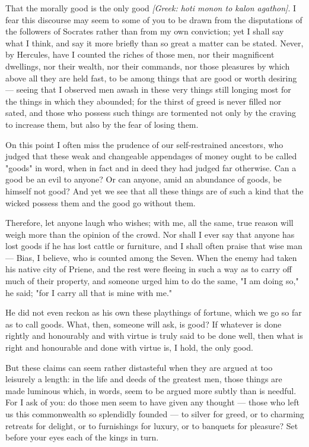  That the morally good is the only good \textit{[Greek: hoti monon to kalon agathon]}. I fear this discourse may seem to some of you to be drawn from the disputations of the followers of Socrates rather than from my own conviction; yet I shall say what I think, and say it more briefly than so great a matter can be stated. Never, by Hercules, have I counted the riches of those men, nor their magnificent dwellings, nor their wealth, nor their commands, nor those pleasures by which above all they are held fast, to be among things that are good or worth desiring — seeing that I observed men awash in these very things still longing most for the things in which they abounded; for the thirst of greed is never filled nor sated, and those who possess such things are tormented not only by the craving to increase them, but also by the fear of losing them.

 On this point I often miss the prudence of our self-restrained ancestors, who judged that these weak and changeable appendages of money ought to be called "goods" in word, when in fact and in deed they had judged far otherwise. Can a good be an evil to anyone? Or can anyone, amid an abundance of goods, be himself not good? And yet we see that all these things are of such a kind that the wicked possess them and the good go without them.

 Therefore, let anyone laugh who wishes; with me, all the same, true reason will weigh more than the opinion of the crowd. Nor shall I ever say that anyone has lost goods if he has lost cattle or furniture, and I shall often praise that wise man — Bias, I believe, who is counted among the Seven. When the enemy had taken his native city of Priene, and the rest were fleeing in such a way as to carry off much of their property, and someone urged him to do the same, "I am doing so," he said; "for I carry all that is mine with me."

 He did not even reckon as his own these playthings of fortune, which we go so far as to call goods. What, then, someone will ask, is good? If whatever is done rightly and honourably and with virtue is truly said to be done well, then what is right and honourable and done with virtue is, I hold, the only good.

 But these claims can seem rather distasteful when they are argued at too leisurely a length: in the life and deeds of the greatest men, those things are made luminous which, in words, seem to be argued more subtly than is needful. For I ask of you: do those men seem to have given any thought — those who left us this commonwealth so splendidly founded — to silver for greed, or to charming retreats for delight, or to furnishings for luxury, or to banquets for pleasure? Set before your eyes each of the kings in turn.

